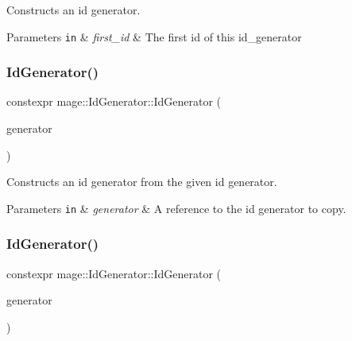 Constructs an id generator.


\begin{DoxyParams}[1]{Parameters}
\mbox{\tt in}  & {\em first\+\_\+id} & The first id of this id\+\_\+generator \\
\hline
\end{DoxyParams}
\hypertarget{classmage_1_1_id_generator_af9031d6e7bdec72d7d46c975d3ff2476}{}\label{classmage_1_1_id_generator_af9031d6e7bdec72d7d46c975d3ff2476} 
\subsubsection{\texorpdfstring{Id\+Generator()}{IdGenerator()}\hspace{0.1cm}{\footnotesize\ttfamily [2/3]}}
{\footnotesize\ttfamily constexpr mage\+::\+Id\+Generator\+::\+Id\+Generator (\begin{DoxyParamCaption}\item[{const \hyperlink{classmage_1_1_id_generator}{Id\+Generator} \&}]{generator }\end{DoxyParamCaption})\hspace{0.3cm}{\ttfamily [delete]}}

Constructs an id generator from the given id generator.


\begin{DoxyParams}[1]{Parameters}
\mbox{\tt in}  & {\em generator} & A reference to the id generator to copy. \\
\hline
\end{DoxyParams}
\hypertarget{classmage_1_1_id_generator_a1f1da4e89427aaad06adb665b95ca70a}{}\label{classmage_1_1_id_generator_a1f1da4e89427aaad06adb665b95ca70a} 
\subsubsection{\texorpdfstring{Id\+Generator()}{IdGenerator()}\hspace{0.1cm}{\footnotesize\ttfamily [3/3]}}
{\footnotesize\ttfamily constexpr mage\+::\+Id\+Generator\+::\+Id\+Generator (\begin{DoxyParamCaption}\item[{\hyperlink{classmage_1_1_id_generator}{Id\+Generator} \&\&}]{generator }\end{DoxyParamCaption})\hspace{0.3cm}{\ttfamily [delete]}}

